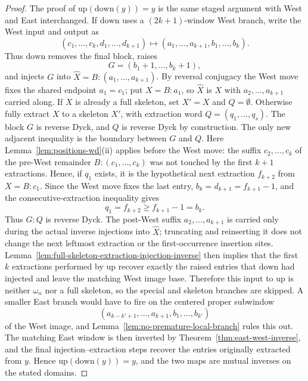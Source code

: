 \documentclass[11pt]{article}
\theoremstyle{plain}
\theoremstyle{definition}
\theoremstyle{remark}
\begin{document}
\begin{proof}
The proof of \(\mathrm{up}(\mathrm{down}(y))=y\) is the same staged argument
with West and East interchanged.  If \(\mathrm{down}\) uses a
\((2k+1)\)-window West branch, write the West input and output as
\[
  (c_1,\ldots,c_k,d_1,\ldots,d_{k+1})
  \longmapsto
  (a_1,\ldots,a_{k+1},b_1,\ldots,b_k).
\]
Thus \(\mathrm{down}\) removes the final block, raises
\[
  G=(b_1+1,\ldots,b_k+1),
\]
and injects \(G\) into
\(\widehat X=B:(a_1,\ldots,a_{k+1})\).  By reversal conjugacy the West move
fixes the shared endpoint \(a_1=c_1\); put \(X=B:a_1\), so
\(\widehat X\) is \(X\) with \(a_2,\ldots,a_{k+1}\) carried along.  If \(X\)
is already a full skeleton, set \(X'=X\) and \(Q=\emptyset\).  Otherwise fully
extract \(X\) to a skeleton \(X'\), with extraction word
\(Q=(q_1,\ldots,q_s)\).  The block \(G\) is reverse Dyck, and \(Q\) is reverse
Dyck by construction.  The only new adjacent inequality is the boundary
between \(G\) and \(Q\).  Here Lemma~\ref{lem:positions-wd}\textup{(ii)}
applies before the West move: the suffix \(c_2,\ldots,c_k\) of the pre-West
remainder \(B:(c_1,\ldots,c_k)\) was not touched by the first \(k+1\)
extractions.  Hence, if \(q_1\) exists, it is the hypothetical next extraction
\(f_{k+2}\) from \(X=B:c_1\).  Since the West move fixes the last entry,
\(b_k=d_{k+1}=f_{k+1}-1\), and the consecutive-extraction inequality gives
\[
  q_1=f_{k+2}\ge f_{k+1}-1=b_k.
\]
Thus \(G:Q\) is reverse Dyck.  The post-West suffix
\(a_2,\ldots,a_{k+1}\) is carried only during the actual inverse injections
into \(\widehat X\); truncating and reinserting it does not change the next
leftmost extraction or the first-occurrence insertion sites.
Lemma~\ref{lem:full-skeleton-extraction-injection-inverse} then implies that
the first \(k\) extractions performed by \(\mathrm{up}\) recover exactly the
raised entries that \(\mathrm{down}\) had injected and leave the matching West
image base.  Therefore this input to \(\mathrm{up}\) is neither \(\omega_n\)
nor a full skeleton, so the special and skeleton branches are skipped.  A
smaller East branch would have to fire on the centered proper
subwindow
\[
  (a_{k-k'+1},\ldots,a_{k+1},b_1,\ldots,b_{k'})
\]
of the West image, and Lemma~\ref{lem:no-premature-local-branch} rules this
out.  The matching East window is then inverted by
Theorem~\ref{thm:east-west-inverse}, and the final injection--extraction
steps recover the entries originally
extracted from \(y\).  Hence \(\mathrm{up}(\mathrm{down}(y))=y\), and the two
maps are mutual inverses on the stated domains.
\end{proof}
\end{document}
